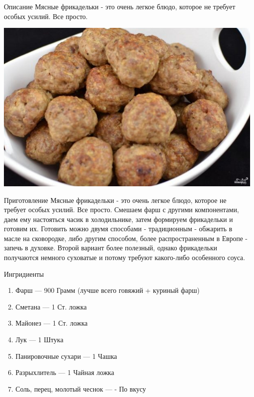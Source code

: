 \documentclass[t,hyperref={pdftex,unicode}]{beamer}  %
\begin{document}
\begin{frame}[allowframebreaks]
	\frametitle{\insertsection}
	\framesubtitle{\insertsubsection}
	
	\begin{block}{Описание}
		Мясные фрикадельки - это очень легкое блюдо, которое не требует особых усилий. Все просто.
		\begin{center}
			\includegraphics[scale=0.3]{6_3.jpg}
		\end{center}
	\end{block}
	
	\framebreak
	
	\begin{block}{Приготовление}
	Мясные фрикадельки - это очень легкое блюдо, которое не требует особых усилий. Все просто. Смешаем фарш с другими компонентами, даем ему настояться часик в холодильнике, затем формируем фрикадельки и готовим их. Готовить можно двумя способами - традиционным - обжарить в масле на сковородке, либо другим способом, более распространенным в Европе - запечь в духовке. Второй вариант более полезный, однако фрикадельки получаются немного суховатые и потому требуют какого-либо особенного соуса.
	\end{block}
	
	\framebreak
	
	\begin{block}{Ингридиенты}
	\begin{enumerate}
		\item Фарш — 900 Грамм (лучше всего говяжий + куриный фарш)
		\item Сметана — 1 Ст. ложка
		\item Майонез — 1 Ст. ложка
		\item Лук — 1 Штука
		\item Панировочные сухари — 1 Чашка
		\item Разрыхлитель — 1 Чайная ложка
		\item Соль, перец, молотый чеснок — - По вкусу
	\end{enumerate}
	\end{block}
	
\end{frame}
\end{document}
